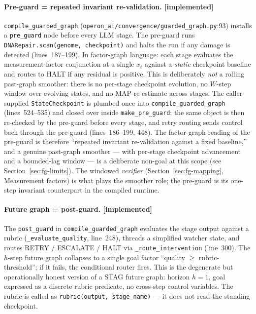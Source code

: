\paragraph{Pre-guard = repeated invariant re-validation. [implemented]}
\texttt{compile\_guarded\_graph}
(\texttt{operon\_ai/convergence/guarded\_graph.py}:93) installs a
\texttt{pre\_guard} node before every LLM stage.  The pre-guard runs
\texttt{DNARepair.scan(genome, checkpoint)} and halts the run if any
damage is detected (lines~187--199).  In factor-graph language: each
stage evaluates the measurement-factor conjunction at a single
$x_t$ against a \emph{static} checkpoint baseline and routes to
HALT if any residual is positive.  This is deliberately \emph{not}
a rolling past-graph smoother: there is no per-stage checkpoint
evolution, no $W$-step window over evolving states, and no MAP
re-estimate across stages.  The caller-supplied
\texttt{StateCheckpoint} is plumbed once into
\texttt{compile\_guarded\_graph} (lines~524--535) and closed over
inside \texttt{make\_pre\_guard}; the same object is then re-checked
by the pre-guard before every stage, and retry routing sends
control back through the pre-guard (lines~186--199, 448).  The factor-graph
reading of the pre-guard is therefore ``repeated invariant
re-validation against a fixed baseline,'' and a genuine past-graph
smoother --- with per-stage checkpoint advancement and a
bounded-lag window --- is a deliberate non-goal at this scope
(see Section~\ref{sec:fg-limits}).  The windowed \emph{verifier}
(Section~\ref{sec:fg-mapping}, Measurement factors) is what plays
the smoother role; the pre-guard is its one-step invariant
counterpart in the compiled runtime.

\paragraph{Future graph = post-guard. [implemented]}
The \texttt{post\_guard} in \texttt{compile\_guarded\_graph}
evaluates the stage output against a rubric
(\texttt{\_evaluate\_quality}, line~248), threads a simplified
watcher state, and routes RETRY / ESCALATE / HALT via
\texttt{\_route\_intervention} (line~300).  The $h$-step future
graph collapses to a single goal factor ``quality $\ge$
rubric-threshold''; if it fails, the conditional router fires.
This is the degenerate but operationally honest version of a STAG
future graph: horizon $h = 1$, goal expressed as a discrete rubric
predicate, no cross-step control variables.  The rubric is called
as \texttt{rubric(output, stage\_name)} --- it does not read the
standing checkpoint.

